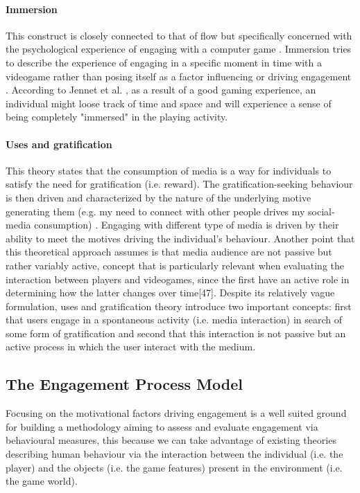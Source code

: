 \paragraph*{Immersion} This construct is closely connected to that of flow but specifically concerned with the psychological experience of engaging with a computer game \cite{jennett2008measuring}. Immersion tries to describe the experience of engaging in a specific moment in time with a videogame  rather than posing itself as a factor influencing or driving engagement \cite{jennett2008measuring}. According to Jennet et al. \cite{jennett2008measuring}, as a result of a good gaming experience, an individual might loose track of time and space and will experience a sense of being completely "immersed" in the playing activity.

\paragraph*{Uses and gratification} This theory states that the consumption of media is a way for individuals to satisfy the need for gratification (i.e. reward). The gratification-seeking behaviour is then driven and characterized by the nature of the underlying motive generating them (e.g. my need to connect with other people drives my social-media consumption) \cite{lucas2004sex}. Engaging with different type of media is driven by their ability to meet the motives driving the individual's behaviour. Another point that this theoretical approach assumes is that media audience are not passive but rather variably active, concept that is particularly relevant when evaluating the interaction between players and videogames, since the first have an active role in determining how the latter changes over time[47]. Despite its relatively vague formulation, uses and gratification theory introduce two important concepts: first that users engage in a spontaneous activity (i.e. media interaction) in search of some form of gratification and second that this interaction is not passive but an active process in which the user interact with the medium.

\subsection{The Engagement Process Model}
\label{eng_proc_model}
Focusing on the motivational factors driving engagement is a well suited ground for building a methodology aiming to assess and evaluate engagement via behavioural measures, this because we can take advantage of existing theories describing human behaviour via the interaction between the individual (i.e. the player) and the objects (i.e. the game features) present in the environment (i.e. the game world).


